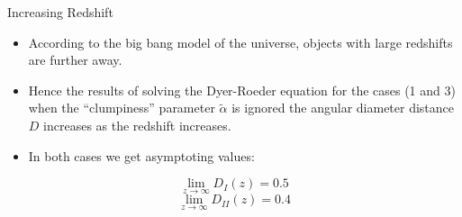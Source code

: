 \documentclass[aspectratio=1610,xcolor=dvipsnames,t]{beamer}
\begin{document}
\begin{frame}{Increasing Redshift} 
\begin{itemize}
\item According to the big bang model of the universe, objects with large
redshifts are further away. 
\item Hence the results of solving the Dyer-Roeder
equation for the cases (1 and 3) when the ``clumpiness'' parameter 
$\tilde{\alpha}$ is ignored the angular diameter distance $D$ increases
as the redshift increases. 
\item In both cases we get asymptoting values:
\end{itemize} 
\begin{equation}
    \lim_{z \rightarrow \infty} D_{I}(z) = 0.5
\end{equation}
\begin{equation}
    \lim_{z \rightarrow \infty} D_{II}(z) = 0.4
\end{equation}
\end{frame} 

\end{document}
